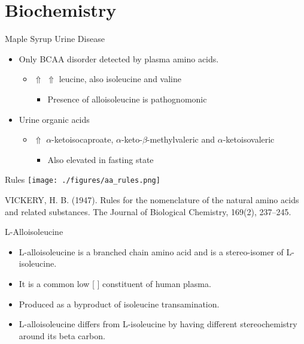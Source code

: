 \documentclass[presentation, smaller]{beamer}
\begin{document}
\section{Biochemistry}
\label{sec:orgheadline12}
\begin{frame}[label={sec:orgheadline4}]{Maple Syrup Urine Disease}
\begin{itemize}
\item Only BCAA disorder detected by plasma amino acids.
\begin{itemize}
\item \(\Uparrow\) \(\Uparrow\) leucine, also isoleucine and valine
\begin{itemize}
\item Presence of alloisoleucine is pathognomonic
\end{itemize}
\end{itemize}
\item Urine organic acids
\begin{itemize}
\item \(\Uparrow\) \(\alpha\)-ketoisocaproate,
\(\alpha\)-keto-\(\beta\)-methylvaleric and \(\alpha\)-ketoisovaleric
\begin{itemize}
\item Also elevated in fasting state
\end{itemize}
\end{itemize}
\end{itemize}
\end{frame}
\begin{frame}[label={sec:orgheadline5}]{Rules}
\texttt{[image: ./figures/aa\_rules.png]}


VICKERY, H. B. (1947). Rules for the nomenclature of the natural amino
acids and related substances. The Journal of Biological Chemistry,
169(2), 237–245.
\end{frame}

\begin{frame}[label={sec:orgheadline6}]{L-Alloisoleucine}
\begin{itemize}
\item L-alloisoleucine is a branched chain amino acid and is a
stereo-isomer of L-isoleucine.
\item It is a common low [ ] constituent of human plasma.
\item Produced as a byproduct of isoleucine transamination.
\item L-alloisoleucine differs from L-isoleucine by having
different stereochemistry around its beta carbon.
\end{itemize}

\centering
{}
\end{frame}
\end{document}
